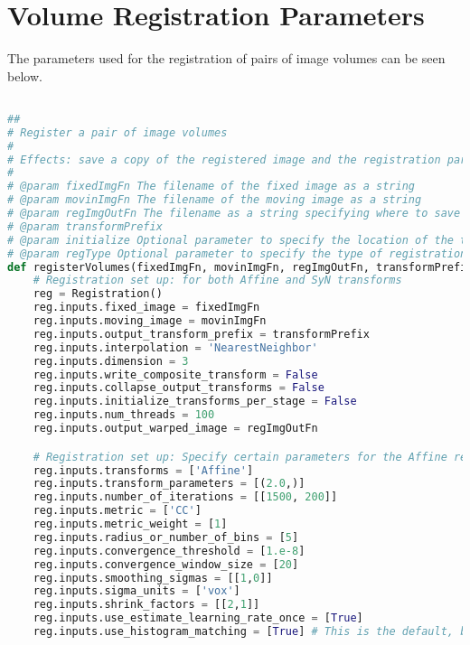 \chapter{Volume Registration Parameters}
\label{appendix:registration-params}

The parameters used for the registration of pairs of image volumes can be seen below.

\begin{lstlisting}[language=Python]

##
# Register a pair of image volumes
#
# Effects: save a copy of the registered image and the registration parameters
#
# @param fixedImgFn The filename of the fixed image as a string
# @param movinImgFn The filename of the moving image as a string
# @param regImgOutFn The filename as a string specifying where to save the registered moving image
# @param transformPrefix 
# @param initialize Optional parameter to specify the location of the transform matrix from the previous registration
# @param regType Optional parameter to specify the type of registration to use (affine ['Affine'] or nonlinear ['Syn']) Default: nonlinear
def registerVolumes(fixedImgFn, movinImgFn, regImgOutFn, transformPrefix, initialize=None, regtype='nonlinear'):
    # Registration set up: for both Affine and SyN transforms
    reg = Registration()
    reg.inputs.fixed_image = fixedImgFn
    reg.inputs.moving_image = movinImgFn
    reg.inputs.output_transform_prefix = transformPrefix 
    reg.inputs.interpolation = 'NearestNeighbor'
    reg.inputs.dimension = 3
    reg.inputs.write_composite_transform = False 
    reg.inputs.collapse_output_transforms = False
    reg.inputs.initialize_transforms_per_stage = False
    reg.inputs.num_threads = 100
    reg.inputs.output_warped_image = regImgOutFn

    # Registration set up: Specify certain parameters for the Affine registration step
    reg.inputs.transforms = ['Affine']
    reg.inputs.transform_parameters = [(2.0,)]
    reg.inputs.number_of_iterations = [[1500, 200]] 
    reg.inputs.metric = ['CC'] 
    reg.inputs.metric_weight = [1]
    reg.inputs.radius_or_number_of_bins = [5] 
    reg.inputs.convergence_threshold = [1.e-8]
    reg.inputs.convergence_window_size = [20]
    reg.inputs.smoothing_sigmas = [[1,0]]
    reg.inputs.sigma_units = ['vox']
    reg.inputs.shrink_factors = [[2,1]]
    reg.inputs.use_estimate_learning_rate_once = [True]
    reg.inputs.use_histogram_matching = [True] # This is the default, but specify it anyway


\end{lstlisting}
